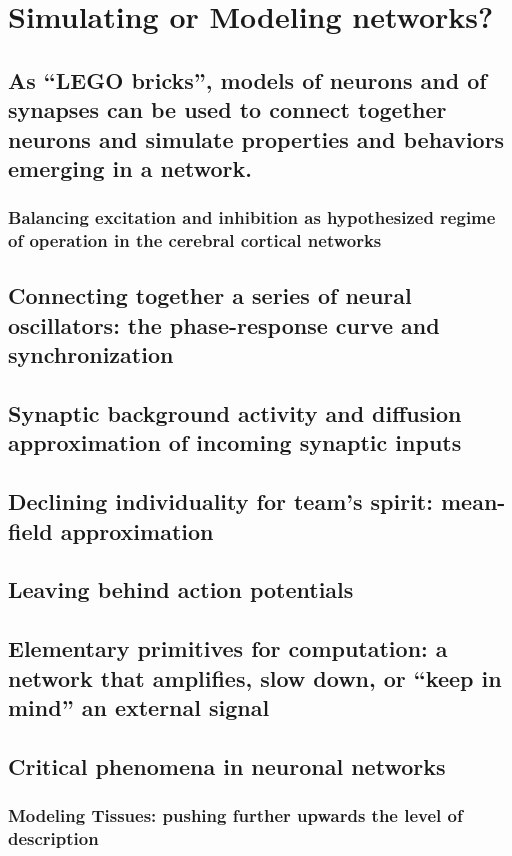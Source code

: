 \chapter{Simulating or Modeling networks?}
\label{net} %

\section{As “LEGO bricks”, models of neurons and of synapses can be used to connect together neurons and simulate properties and behaviors emerging in a network.}
		\subsection{Balancing excitation and inhibition as hypothesized regime of operation in the cerebral cortical networks}
	\section{Connecting together a series of neural oscillators: the phase-response curve and synchronization}
	\section{Synaptic background activity and diffusion approximation of incoming synaptic inputs }
	\section{Declining individuality for team’s spirit: mean-field approximation}
	\section{Leaving behind action potentials }
	\section{Elementary primitives for computation: a network that amplifies, slow down, or “keep in mind” an external signal}
	\section{Critical phenomena in neuronal networks}
	\subsection{Modeling Tissues: pushing further upwards the level of description}